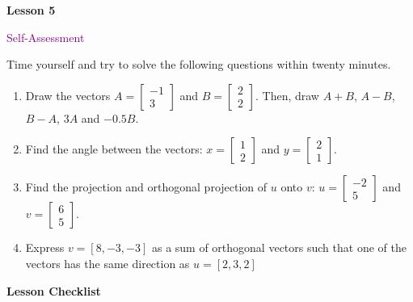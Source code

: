 \documentclass[10pt]{book}
\theoremstyle{definition}
\theoremstyle{remark}
\begin{document}
\begin{tcolorbox}[
  width=\textwidth,
  colback=gray!10, %
  colframe=white, %
  boxrule=0pt,    %
  left=1cm,       %
  right=1cm,      %
  sharp corners  %
]

\begin{minipage}[t]{0.5\textwidth}
  \Huge \textbf{Lesson 5}
\end{minipage}%
\hfill
\begin{minipage}[t]{0.5\textwidth}
  \Huge\textcolor{purple}{Self-Assessment}
\end{minipage}
\end{tcolorbox}

\begin{large}
\noindent
Time yourself and try to solve the following questions within twenty minutes. 
\begin{enumerate}
\item Draw the vectors $A = \begin{bmatrix} -1 \\ 3 \end{bmatrix}$ and $B = \begin{bmatrix} 2 \\ 2 \end{bmatrix}$.    Then, draw $A + B$, $A - B$, $B - A$, $3A$ and $-0.5B$.\vfil
\item Find the angle between the vectors: $x = \begin{bmatrix} 1 \\ 2  \end{bmatrix}$ and $y=\begin{bmatrix}2 \\ 1 \end{bmatrix}$.\vfil
\item Find the projection and orthogonal projection of $u$ onto $v$: $u= \begin{bmatrix} -2 \\ 5 \end{bmatrix}$ and $v=\begin{bmatrix} 6 \\5 \end{bmatrix}$.\vfil
\item Express $v = [8,-3,-3]$ as a sum of orthogonal vectors such that one of the vectors has the same direction as $u = [2, 3, 2]$\vfil
\end{enumerate}

\noindent
\textbf{Lesson Checklist}
\bigskip


\end{large}
\end{document}
